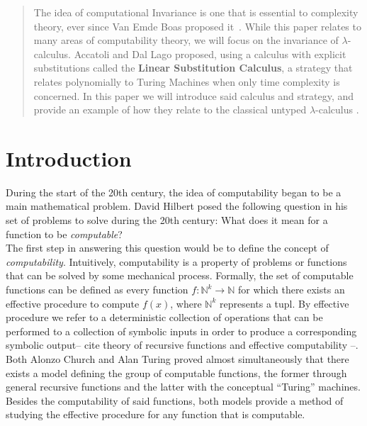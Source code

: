 \message{ !name(VU-CS-BSc-thesis-template.tex)}\documentclass[11pt]{article}
\begin{document}
\begin{abstract}
  The idea of computational Invariance is one that is essential to complexity theory, ever since Van Emde Boas proposed it~\cite{machine-models}. While this paper relates to many areas of computability theory, we will focus on the invariance of $\lambda$-calculus. Accatoli and Dal Lago proposed, using a calculus with explicit substitutions called the \textbf{Linear Substitution Calculus}, a strategy that relates polynomially to Turing Machines when only time complexity is concerned. In this paper we will introduce said calculus and strategy, and provide an example of how they relate to the classical untyped $\lambda$-calculus .\end{abstract}
\section{Introduction}
During the start of the 20th century, the idea of computability began to be a main mathematical problem. David Hilbert posed the following question in his set of problems to solve during the 20th century: What does it mean for a function to be \textit{computable}? \\
The first step in answering this question would be to define the concept of \textit{computability}. Intuitively, computability is a property of problems or functions that can be solved by some mechanical process. Formally, the set of computable functions can be defined as every function $f : \mathbb{N}^k \rightarrow \mathbb{N}$ for which there exists an effective procedure to compute $f(x)$, where $\mathbb{N}^k$ represents a tupl. By effective procedure we refer to a deterministic collection of operations that can be performed to a collection of symbolic inputs in order to produce a corresponding symbolic output-- cite theory of recursive functions and effective computability --. \\
 Both Alonzo Church and Alan Turing proved almost simultaneously that there exists a model defining the group of computable functions, the former through general recursive functions and the latter with the conceptual \enquote{Turing} machines.
 Besides the computability of said functions, both models provide a method of studying the effective procedure for any function that is computable.
\end{document}
